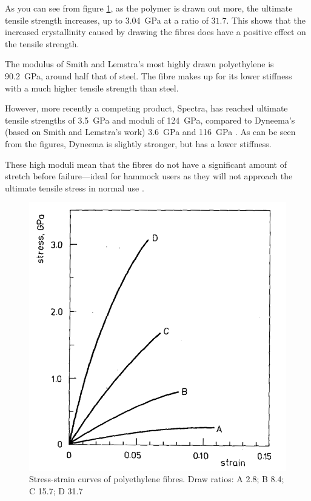 As you can see from figure \ref{fig:pe_fibre_ss}, as the polymer is drawn out more, the ultimate tensile strength increases, up to \SI{3.04}{\giga\pascal} at a ratio of $31.7$. This shows that the increased crystallinity caused by drawing the fibres does have a positive effect on the tensile strength.

The modulus of Smith and Lemstra's most highly drawn polyethylene is \SI{90.2}{\giga\pascal}, around half that of steel. The fibre makes up for its lower stiffness with a much higher tensile strength than steel.

However, more recently a competing product, Spectra, has reached ultimate tensile strengths of \SI{3.5}{\giga\pascal} and moduli of \SI{124}{\giga\pascal}, compared to Dyneema's (based on Smith and Lemstra's work) \SI{3.6}{\giga\pascal} and \SI{116}{\giga\pascal} . As can be seen from the figures, Dyneema is slightly stronger, but has a lower stiffness.

These high moduli mean that the fibres do not have a significant amount of stretch before failure---ideal for hammock users as they will not approach the ultimate tensile stress in normal use .

\begin{figure}
\centering
\includegraphics[width=0.8\columnwidth]{images/pe_stress_strain}
\caption{Stress-strain curves of polyethylene fibres. Draw ratios: A 2.8; B 8.4; C 15.7; D 31.7 }
\label{fig:pe_fibre_ss}
\end{figure}

